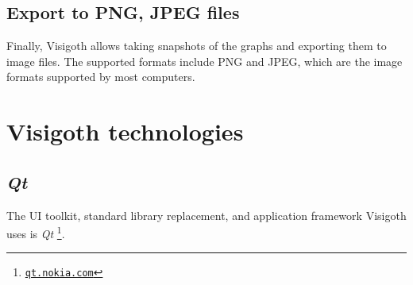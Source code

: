 \documentclass[a4paper,11pt,titlepage]{article}
\let\stdhref\href
\renewcommand{\href}[2]{\stdhref{#1}{\texttt{#2}}}
\let\stdsection\section         %
\renewcommand{\section}{\newpage\stdsection}
\newcommand{\buzz}[1]{\emph{#1}}
\newcommand{\myhref}[1]{\href{http://#1}{#1}}
\newcommand{\Qt}{\buzz{Qt} }
\begin{document}
\subsection{Export to PNG, JPEG files}
Finally, Visigoth allows taking snapshots of the graphs and exporting them to
image files. The supported formats include PNG and JPEG, which are the image
formats supported by most computers.

\section{Visigoth technologies}

\subsection{\Qt}

The UI toolkit, standard library replacement, and application
framework Visigoth uses is \Qt\footnote{\myhref{qt.nokia.com}}.
\end{document}
